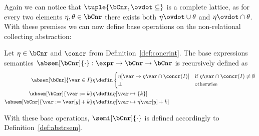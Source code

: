 Again we can notice that \(\tuple{\bCnr, \ovdot\subseteq}\) is a
complete lattice, as for every two elements \(\eta,\theta\in\bCnr\)
there exists both \(\eta \ovdot\cup \theta\) and
\(\eta \ovdot\cap \theta\). With these premises we can now define base
operations on the non-relational collecting abstraction:
\begin{definition}
  Let \(\eta \in \bCnr\) and \(\concr\) from
  Definition~\ref{def:concrint}. The base expressions semantics
  \(\absem[\bCnr]{\cdot} : \expr \to \bCnr \to \bCnr\) is recursively
  defined as
  \begin{align*}
    \absem[\bCnr]{\var\in I}\eta & \defin
                                   \begin{cases}
                                     \eta[\var\mapsto\eta\var\cap \concr(I)] & \text{if } \eta\var\cap \concr(I) \neq \emptyset \\
                                     \bot & \text{otherwise}
                                   \end{cases} \\
    \absem[\bCnr]{\var := k}\eta & \defin \eta[\var\mapsto\{k\}] \\
    \absem[\bCnr]{\var := \var[y] + k}\eta & \defin \eta[\var\mapsto \eta\var[y] + k] \\
  \end{align*}
\end{definition}
With these base operations, \(\semi[\bCnr]{\cdot}\) is defined
accordingly to Definition~\ref{def:abstrsem}.
